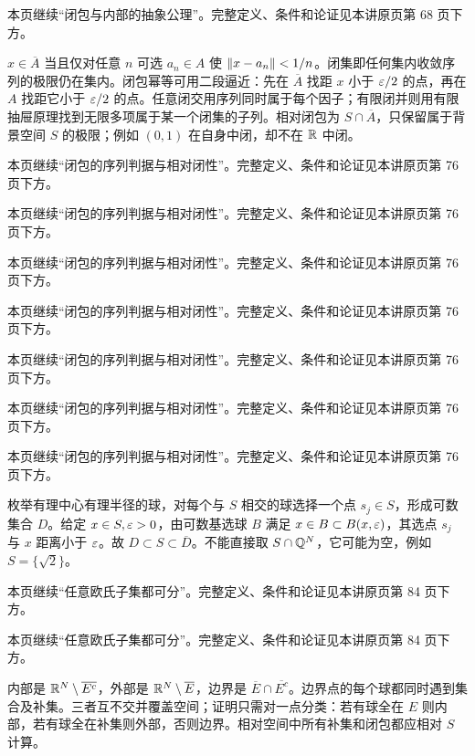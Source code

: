 本页继续“闭包与内部的抽象公理”。完整定义、条件和论证见本讲原页第 68 页下方。

$x\in\overline A$ 当且仅对任意 $n$ 可选 $a_n\in A$ 使 $\left\lVert x-a_n\right\rVert<1/n$。闭集即任何集内收敛序列的极限仍在集内。闭包幂等可用二段逼近：先在 $\overline A$ 找距 $x$ 小于 $\varepsilon/2$ 的点，再在 $A$ 找距它小于 $\varepsilon/2$ 的点。任意闭交用序列同时属于每个因子；有限闭并则用有限抽屉原理找到无限多项属于某一个闭集的子列。相对闭包为 $S\cap\overline A$，只保留属于背景空间 $S$ 的极限；例如 $(0,1)$ 在自身中闭，却不在 $\mathbb{R}$ 中闭。

本页继续“闭包的序列判据与相对闭性”。完整定义、条件和论证见本讲原页第 76 页下方。

本页继续“闭包的序列判据与相对闭性”。完整定义、条件和论证见本讲原页第 76 页下方。

本页继续“闭包的序列判据与相对闭性”。完整定义、条件和论证见本讲原页第 76 页下方。

本页继续“闭包的序列判据与相对闭性”。完整定义、条件和论证见本讲原页第 76 页下方。

本页继续“闭包的序列判据与相对闭性”。完整定义、条件和论证见本讲原页第 76 页下方。

本页继续“闭包的序列判据与相对闭性”。完整定义、条件和论证见本讲原页第 76 页下方。

本页继续“闭包的序列判据与相对闭性”。完整定义、条件和论证见本讲原页第 76 页下方。

枚举有理中心有理半径的球，对每个与 $S$ 相交的球选择一个点 $s_j\in S$，形成可数集合 $D$。给定 $x\in S,\varepsilon>0$，由可数基选球 $B$ 满足 $x\in B\subset B(x,\varepsilon)$，其选点 $s_j$ 与 $x$ 距离小于 $\varepsilon$。故 $D\subset S\subset\overline D$。不能直接取 $S\cap\mathbb{Q}^N$，它可能为空，例如 $S=\{\sqrt2\}$。

本页继续“任意欧氏子集都可分”。完整定义、条件和论证见本讲原页第 84 页下方。

本页继续“任意欧氏子集都可分”。完整定义、条件和论证见本讲原页第 84 页下方。

内部是 $\mathbb{R}^N\setminus\overline{E^c}$，外部是 $\mathbb{R}^N\setminus\overline E$，边界是 $\overline E\cap\overline{E^c}$。边界点的每个球都同时遇到集合及补集。三者互不交并覆盖空间；证明只需对一点分类：若有球全在 $E$ 则内部，若有球全在补集则外部，否则边界。相对空间中所有补集和闭包都应相对 $S$ 计算。

